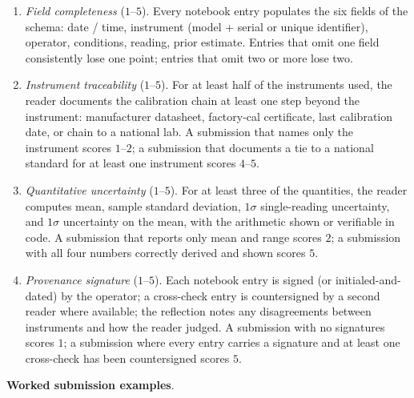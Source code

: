\begin{project}
\begin{enumerate}[leftmargin=*]
  \item \emph{Field completeness} ($1$--$5$). Every notebook entry
    populates the six fields of the schema: date / time, instrument
    (model + serial or unique identifier), operator, conditions,
    reading, prior estimate. Entries that omit one field
    consistently lose one point; entries that omit two or more lose
    two.
  \item \emph{Instrument traceability} ($1$--$5$). For at least
    half of the instruments used, the reader documents the
    calibration chain at least one step beyond the instrument:
    manufacturer datasheet, factory-cal certificate, last
    calibration date, or chain to a national lab. A submission
    that names only the instrument scores $1$--$2$; a submission
    that documents a tie to a national standard for at least one
    instrument scores $4$--$5$.
  \item \emph{Quantitative uncertainty} ($1$--$5$). For at least
    three of the quantities, the reader computes mean, sample
    standard deviation, $1\sigma$ single-reading uncertainty, and
    $1\sigma$ uncertainty on the mean, with the arithmetic shown
    or verifiable in code. A submission that reports only mean
    and range scores $2$; a submission with all four numbers
    correctly derived and shown scores $5$.
  \item \emph{Provenance signature} ($1$--$5$). Each notebook
    entry is signed (or initialed-and-dated) by the operator; a
    cross-check entry is countersigned by a second reader where
    available; the reflection notes any disagreements between
    instruments and how the reader judged. A submission with no
    signatures scores $1$; a submission where every entry carries
    a signature and at least one cross-check has been
    countersigned scores $5$.
\end{enumerate}

\textbf{Worked submission examples}.


\end{project}
